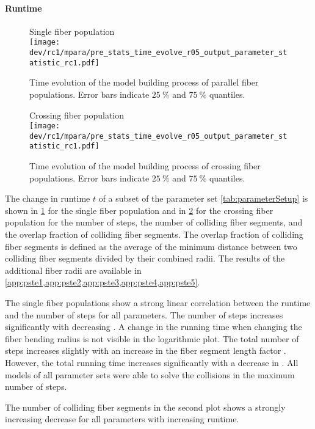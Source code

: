 \paragraph{Runtime}
%
\begin{figure}[p]
\centering
Single fiber population\\[0em]
\texttt{[image: dev/rc1/mpara/pre\_stats\_time\_evolve\_r05\_output\_parameter\_statistic\_rc1.pdf]}
\caption{Time evolution of the model building process of parallel fiber populations. Error bars indicate $\SI{25}{\percent}$ and $\SI{75}{\percent}$ quantiles.}
\label{fig:timeDevelopmentNone}
\end{figure}
%
\begin{figure}[p]
\centering
Crossing fiber population\\[0ex]
\texttt{[image: dev/rc1/mpara/pre\_stats\_time\_evolve\_r05\_output\_parameter\_statistic\_rc1.pdf]}
\caption{Time evolution of the model building process of crossing fiber populations. Error bars indicate $\SI{25}{\percent}$ and $\SI{75}{\percent}$ quantiles.}
\label{fig:timeDevelopmentCross}
\end{figure}
%
The change in runtime $t$ of a subset of the parameter set \cref{tab:parameterSetup} is shown in \cref{fig:timeDevelopmentNone} for the single fiber population and in \cref{fig:timeDevelopmentCross} for the crossing fiber population for the number of steps, the number of colliding fiber segments, and the overlap fraction of colliding fiber segments.
The overlap fraction of colliding fiber segments is defined as the average of the minimum distance between two colliding fiber segments divided by their combined radii.
The results of the additional fiber radii are available in \cref{app:pste1,app:pste2,app:pste3,app:pste4,app:pste5}.
\par
%
The single fiber populations show a strong linear correlation between the runtime and the number of steps for all parameters.
The number of steps increases significantly with decreasing \segLengthFactor{}.
A change in the running time when changing the fiber bending radius \segRadiusFactor{} is not visible in the logarithmic plot.
The total number of steps increases slightly with an increase in the fiber segment length factor \segLengthFactor{}.
However, the total running time increases significantly with a decrease in \segLengthFactor{}.
All models of all parameter sets were able to solve the collisions in the maximum number of steps.
\par
%
The number of colliding fiber segments in the second plot shows a strongly increasing decrease for all parameters with increasing runtime.
